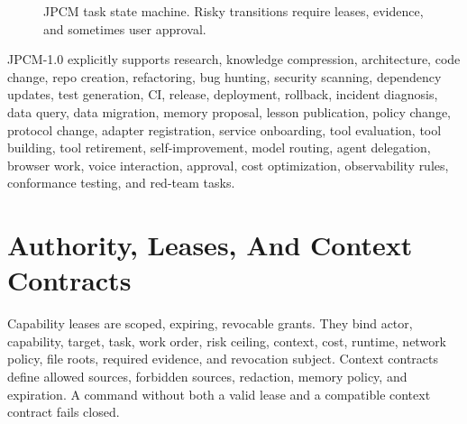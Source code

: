 \documentclass[10pt,journal,onecolumn]{IEEEtran}
\begin{document}
\begin{figure}[!t]
\centering
{}
\caption{JPCM task state machine. Risky transitions require leases, evidence, and sometimes user approval.}
\label{fig:task}
\end{figure}

JPCM-1.0 explicitly supports research, knowledge compression, architecture, code change, repo creation, refactoring, bug hunting, security scanning, dependency updates, test generation, CI, release, deployment, rollback, incident diagnosis, data query, data migration, memory proposal, lesson publication, policy change, protocol change, adapter registration, service onboarding, tool evaluation, tool building, tool retirement, self-improvement, model routing, agent delegation, browser work, voice interaction, approval, cost optimization, observability rules, conformance testing, and red-team tasks.

\section{Authority, Leases, And Context Contracts}
Capability leases are scoped, expiring, revocable grants. They bind actor, capability, target, task, work order, risk ceiling, context, cost, runtime, network policy, file roots, required evidence, and revocation subject. Context contracts define allowed sources, forbidden sources, redaction, memory policy, and expiration. A command without both a valid lease and a compatible context contract fails closed.
\end{document}
